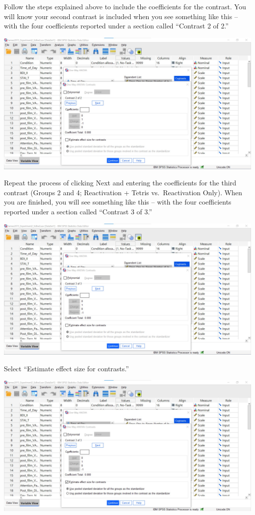 \documentclass[
]{book}
\begin{document}
Follow the steps explained above to include the coefficients for the contrast. You will know your second contrast is included when you see something like this -- with the four coefficients reported under a section called ``Contrast 2 of 2.''

\includegraphics{img/8.6.4.29.png}

Repeat the process of clicking {Next} and entering the coefficients for the third contrast (Groups 2 and 4; Reactivation + Tetris vs.~Reactivation Only). When you are finished, you will see something like this -- with the four coefficients reported under a section called ``Contrast 3 of 3.''

\includegraphics{img/8.6.4.30.png}

Select ``Estimate effect size for contrasts.''

\includegraphics{img/8.6.4.31.png}
\end{document}
